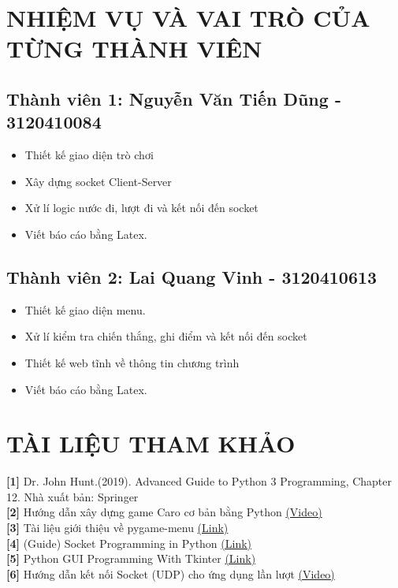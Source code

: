 \documentclass[a4paper]{article}
\begin{document}
\newpage

\section*{NHIỆM VỤ VÀ VAI TRÒ CỦA TỪNG THÀNH VIÊN}
\subsection*{Thành viên 1: Nguyễn Văn Tiến Dũng - 3120410084}
\begin{itemize}
    \item Thiết kế giao diện trò chơi
    \item Xây dựng socket Client-Server
    \item Xử lí logic nước đi, lượt đi và kết nối đến socket
    \item Viết báo cáo bằng Latex.
\end{itemize}

\subsection*{Thành viên 2: Lai Quang Vinh - 3120410613}
\begin{itemize}
    \item Thiết kế giao diện menu.
    \item Xử lí kiểm tra chiến thắng, ghi điểm và kết nối đến socket
    \item Thiết kế web tĩnh về thông tin chương trình
    \item Viết báo cáo bằng Latex.
\end{itemize}

\newpage
\section*{TÀI LIỆU THAM KHẢO}
\begin{par}
    \textbf{[1]} Dr. John Hunt.(2019). Advanced Guide to Python 3 Programming, Chapter 12. Nhà xuất bản: Springer \\
    \textbf{[2]} Hướng dẫn xây dựng game Caro cơ bản bằng Python \href{https://www.youtube.com/watch?v=-zZDmxgrhXg}{(Video)} \\
    \textbf{[3]} Tài liệu giới thiệu về pygame-menu \href{https://pygame-menu.readthedocs.io/en/latest/}{(Link)} \\
    \textbf{[4]} (Guide) Socket Programming in Python \href{https://realpython.com/python-sockets/}{(Link)} \\
    \textbf{[5]} Python GUI Programming With Tkinter \href{https://realpython.com/python-gui-tkinter/}{(Link)} \\
    \textbf{[6]} Hướng dẫn kết nối Socket (UDP) cho ứng dụng lần lượt \href{https://www.youtube.com/watch?v=3qlhbez-RPI}{(Video)} 
\end{par}
\end{document}
